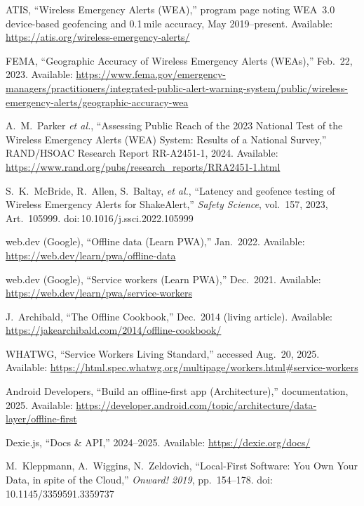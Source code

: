 \documentclass[11pt,twocolumn]{article}
\begin{document}
\begin{thebibliography}{99}
ATIS, ``Wireless Emergency Alerts (WEA),'' program page noting WEA~3.0 device-based geofencing and 0.1\,mile accuracy, May 2019--present. Available: \url{https://atis.org/wireless-emergency-alerts/}

FEMA, ``Geographic Accuracy of Wireless Emergency Alerts (WEAs),'' Feb.\ 22, 2023. Available: \url{https://www.fema.gov/emergency-managers/practitioners/integrated-public-alert-warning-system/public/wireless-emergency-alerts/geographic-accuracy-wea}

A.\ M.\ Parker \emph{et al.}, ``Assessing Public Reach of the 2023 National Test of the Wireless Emergency Alerts (WEA) System: Results of a National Survey,'' RAND/HSOAC Research Report RR-A2451-1, 2024. Available: \url{https://www.rand.org/pubs/research_reports/RRA2451-1.html}

S.\ K.\ McBride, R.\ Allen, S.\ Baltay, \emph{et al.}, ``Latency and geofence testing of Wireless Emergency Alerts for ShakeAlert,'' \emph{Safety Science}, vol.\ 157, 2023, Art.\ 105999. doi:\,10.1016/j.ssci.2022.105999

web.dev (Google), ``Offline data (Learn PWA),'' Jan.\ 2022. Available: \url{https://web.dev/learn/pwa/offline-data}

web.dev (Google), ``Service workers (Learn PWA),'' Dec.\ 2021. Available: \url{https://web.dev/learn/pwa/service-workers}

J.\ Archibald, ``The Offline Cookbook,'' Dec.\ 2014 (living article). Available: \url{https://jakearchibald.com/2014/offline-cookbook/}

WHATWG, ``Service Workers Living Standard,'' accessed Aug.\ 20, 2025. Available: \url{https://html.spec.whatwg.org/multipage/workers.html#service-workers}

Android Developers, ``Build an offline-first app (Architecture),'' documentation, 2025. Available: \url{https://developer.android.com/topic/architecture/data-layer/offline-first}

Dexie.js, ``Docs \& API,'' 2024--2025. Available: \url{https://dexie.org/docs/}

M.\ Kleppmann, A.\ Wiggins, N.\ Zeldovich, ``Local-First Software: You Own Your Data, in spite of the Cloud,'' \emph{Onward! 2019}, pp.\ 154--178. doi:\,10.1145/3359591.3359737


\end{thebibliography}
\end{document}
